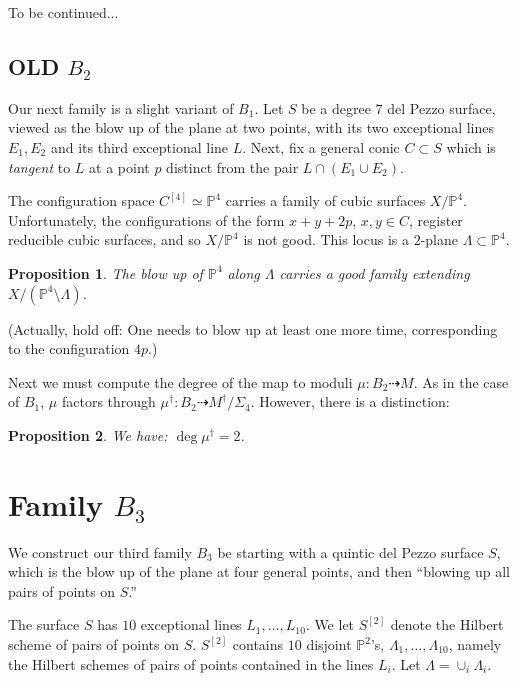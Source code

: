 \documentclass[12 pt]{amsart}
\newtheorem{proposition}{Proposition}[section]
\renewcommand{\P}{\mathbb{P}}
\newcommand{\<}{\left\langle}
\renewcommand{\>}{\right\rangle}
\begin{document}
To be continued...




\subsection{OLD $B_2$}


Our next family is a slight variant of $B_1$. Let $S$ be a degree $7$
del Pezzo surface, viewed as the blow up of the plane at two points,
with its two exceptional lines $E_1, E_2$ and its third exceptional
line $L$.  Next, fix a general conic $C \subset S$ which is {\sl
  tangent} to $L$ at a point $p$ distinct from the pair
$L \cap (E_1 \cup E_2)$.

The configuration space $C^{[4]} \simeq \P^{4}$ carries a family of
cubic surfaces $X/\P^{4}$.  Unfortunately, the configurations of the
form $x+y+2p$, $x,y \in C$, register reducible cubic surfaces, and so
$X/\P^{4}$ is not good.  This locus is a $2$-plane
$\Lambda \subset \P^{4}$.

\begin{proposition}
  \label{proposition:resolveB2} The blow up of $\P^{4}$ along
  $\Lambda$ carries a good family extending
  $X/(\P^{4} \setminus \Lambda)$.
\end{proposition}
(Actually, hold off: One needs to blow up at least one more time,
corresponding to the configuration $4p$.)



Next we must compute the degree of the map to moduli
$\mu: B_2 \dashrightarrow M$. As in the case of $B_1$, $\mu$ factors
through $\mu^{\dagger}: B_2 \dashrightarrow M^\dagger/\Sigma_{4}$.
However,  there is a distinction:

\begin{proposition}
  \label{proposition:deg-mudagger2}
  We have: $\deg \mu^{\dagger} = 2$.
\end{proposition}


\section{Family $B_3$}
\label{sec:family-b_3}

We construct our third family $B_3$ be starting with a quintic del
Pezzo surface $S$, which is the blow up of the plane at four general
points, and then ``blowing up all pairs of points on $S$.''

The surface $S$ has $10$ exceptional lines $L_{1}, \dots, L_{10}$.  We
let $S^{[2]}$ denote the Hilbert scheme of pairs of points on $S$.
$S^{[2]}$ contains $10$ disjoint $\P^{2}$'s,
$\Lambda_1, \dots, \Lambda_{10}$, namely the Hilbert schemes of pairs
of points contained in the lines $L_{i}$. Let
$\Lambda = \cup_{i}\Lambda_{i}$.
\end{document}
